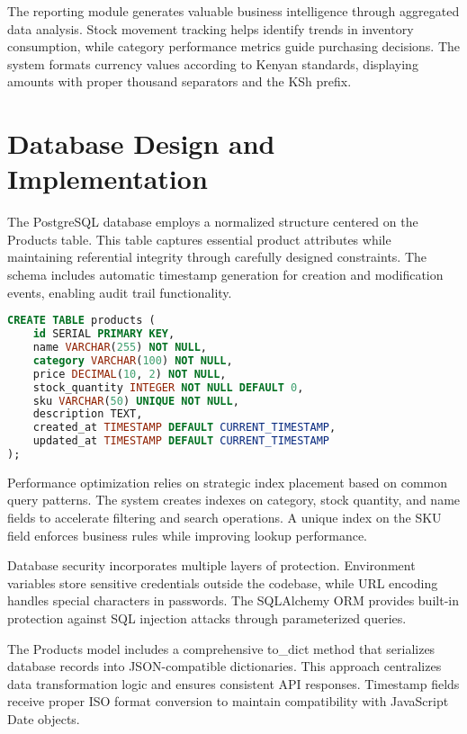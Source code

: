 \documentclass[12pt,a4paper]{article}
\begin{document}
The reporting module generates valuable business intelligence through aggregated data analysis. Stock movement tracking helps identify trends in inventory consumption, while category performance metrics guide purchasing decisions. The system formats currency values according to Kenyan standards, displaying amounts with proper thousand separators and the KSh prefix.

\section{Database Design and Implementation}

The PostgreSQL database employs a normalized structure centered on the Products table. This table captures essential product attributes while maintaining referential integrity through carefully designed constraints. The schema includes automatic timestamp generation for creation and modification events, enabling audit trail functionality.

\begin{lstlisting}[language=SQL, caption=Core Database Schema]
CREATE TABLE products (
    id SERIAL PRIMARY KEY,
    name VARCHAR(255) NOT NULL,
    category VARCHAR(100) NOT NULL,
    price DECIMAL(10, 2) NOT NULL,
    stock_quantity INTEGER NOT NULL DEFAULT 0,
    sku VARCHAR(50) UNIQUE NOT NULL,
    description TEXT,
    created_at TIMESTAMP DEFAULT CURRENT_TIMESTAMP,
    updated_at TIMESTAMP DEFAULT CURRENT_TIMESTAMP
);
\end{lstlisting}

Performance optimization relies on strategic index placement based on common query patterns. The system creates indexes on category, stock quantity, and name fields to accelerate filtering and search operations. A unique index on the SKU field enforces business rules while improving lookup performance.

Database security incorporates multiple layers of protection. Environment variables store sensitive credentials outside the codebase, while URL encoding handles special characters in passwords. The SQLAlchemy ORM provides built-in protection against SQL injection attacks through parameterized queries.

The Products model includes a comprehensive to\_dict method that serializes database records into JSON-compatible dictionaries. This approach centralizes data transformation logic and ensures consistent API responses. Timestamp fields receive proper ISO format conversion to maintain compatibility with JavaScript Date objects.
\end{document}
